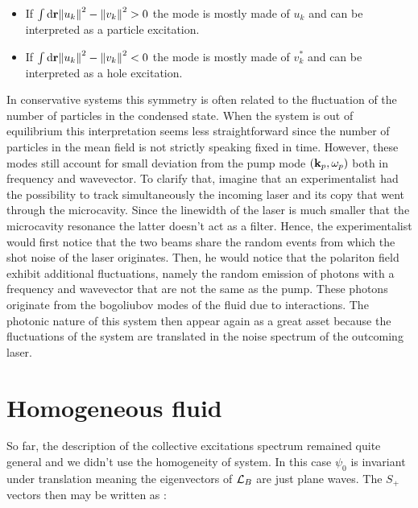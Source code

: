 \begin{itemize}
    \item If $\int \mathrm{d}\mathbf{r}\norm{u_k}^2-\norm{v_k}^2>0$ the mode is mostly made of $u_k$ and can be interpreted as a particle excitation.
    \item If $\int \mathrm{d}\mathbf{r}\norm{u_k}^2-\norm{v_k}^2<0$ the mode is mostly made of $v_k^*$ and can be interpreted as a hole excitation.
\end{itemize}

In conservative systems this symmetry is often related to the fluctuation of the number of particles in the condensed state. When the system is out of equilibrium 
this interpretation seems less straightforward since the number of particles in the mean field is not strictly speaking fixed in time. However, these 
modes still account for small deviation from the pump mode $(\mathbf{k}_p,\omega_p)$ both in frequency and wavevector. To clarify that, imagine that an experimentalist had the possibility to track simultaneously the incoming laser and 
 its copy that went through the microcavity. Since the linewidth of the laser is much smaller that the microcavity resonance the latter doesn't act as a filter. Hence, the experimentalist would first notice that the two beams share the random events from which the shot noise of the laser originates. 
Then, he would notice that the polariton field exhibit additional fluctuations, namely the random emission of photons with a frequency and wavevector that are not the same as the pump.
These photons originate from the bogoliubov modes of the fluid due to interactions. The photonic nature of this system then appear again as a great asset because the fluctuations of the system
are translated in the noise spectrum of the outcoming laser. 


\section{Homogeneous fluid}

So far, the description of the collective excitations spectrum remained quite general and we didn't use the homogeneity of system.
In this case $\psi_0$ is invariant under translation meaning the eigenvectors of $\mathcal{L}_B$ are just plane waves. The $S_+$ vectors then may be written as :

